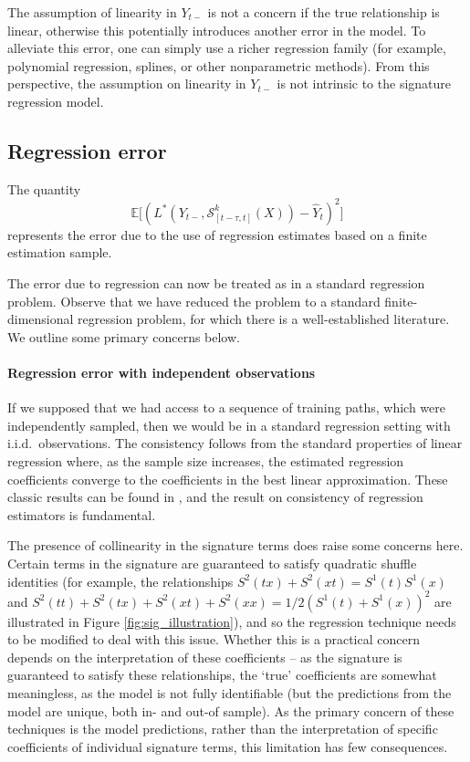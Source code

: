 \documentclass[a4paper, 12pt]{article}
\theoremstyle{remark}
\begin{document}
The assumption of linearity in $Y_{t-}$ is not a concern if the true relationship is linear, otherwise this potentially introduces another error in the model. To alleviate this error, one can simply use a richer regression family (for example, polynomial regression, splines, or other nonparametric methods). From this perspective, the assumption on linearity in $Y_{t-}$ is not intrinsic to the signature regression model.


\subsection{Regression error}\label{sec:reg_error}
The quantity
\[ \mathbb{E}\Big[(L^*(Y_{t-},\mathcal{S}^k_{[t-\tau, t]}(X)) -\hat Y_t)^2\Big]\]
represents the error due to the use of regression estimates based on a finite estimation sample.

The error due to regression can now be treated as in a standard regression problem. Observe that we have reduced the problem to a standard finite-dimensional regression problem, for which there is a well-established literature. We outline some primary concerns below.

\paragraph{Regression error with independent observations}

If we supposed that we had access to a sequence of training paths, which were independently sampled, then we would be in a standard regression setting with i.i.d.~observations. The consistency follows from the standard properties of linear regression where, as the sample size increases, the estimated regression coefficients converge to the coefficients in the best linear approximation. These classic results can be found in \citep{drygas1971consistency, drygas1976weak, amemiya1985advanced}, and the result on consistency of regression estimators is fundamental.

The presence of collinearity in the signature terms does raise some concerns here. Certain terms in the signature are guaranteed to satisfy quadratic shuffle identities (for example, the relationships $S^2(tx) + S^2(xt) = S^1(t)S^1(x)$ and $S^2(tt)+ S^2(tx) + S^2(xt) + S^2(xx) = 1/2(S^1(t)+ S^1(x))^2$ are illustrated in Figure \ref{fig:sig_illustration}), and so the regression technique needs to be modified to deal with this issue. Whether this is a practical concern depends on the interpretation of these coefficients -- as the signature is guaranteed to satisfy these relationships, the `true' coefficients are somewhat meaningless, as the model is not fully identifiable (but the predictions from the model are unique, both in- and out-of sample). As the primary concern of these techniques is the model predictions, rather than the interpretation of specific coefficients of individual signature terms, this limitation has few consequences.
\end{document}
